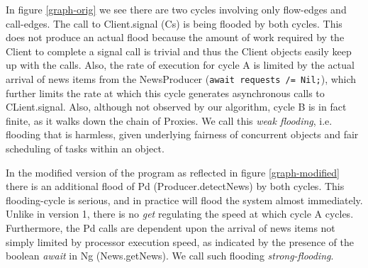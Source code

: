 \documentclass[12pt]{article}%
\begin{document}
In figure \ref{graph-orig} we see there are two cycles involving only flow-edges and call-edges.
The call to Client.signal (Cs) is being flooded by both cycles.
This does not produce an actual flood because the amount of work required by the
Client to complete a signal call is trivial and thus the Client objects easily keep up with the calls. 
Also, the rate of execution for cycle A is
limited by the actual arrival of news items from the NewsProducer (\lstinline{await requests /= Nil;}), 
which further limits the rate at which this cycle generates asynchronous calls to CLient.signal.
Also, although not observed by our algorithm, cycle B is in fact finite, as it walks down the chain of Proxies.
We call this \emph{weak flooding}, i.e. flooding that is harmless, given underlying fairness of concurrent objects and
fair scheduling of tasks within an object.

In the modified version of the program as reflected in figure \ref{graph-modified} there is an additional flood of
Pd (Producer.detectNews) by both cycles. This flooding-cycle is serious, and in practice will flood the system almost immediately.
Unlike in version 1, there is no \emph{get} regulating the speed at which cycle A cycles. Furthermore, the Pd calls are dependent upon the
arrival of news items not simply limited by processor execution speed, as indicated by the presence of the boolean \emph{await} in Ng (News.getNews).
We call such flooding \emph{strong-flooding}.

%
\end{document}
